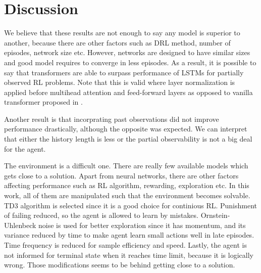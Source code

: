 \section{Discussion}
We believe that these results are not enough to say any model is superior to another, because there are other factors such as DRL method, number of episodes, network size etc. 
However, networks are designed to have similar sizes and good model requires to converge in less episodes. 
As a result, it is possible to say that transformers are able to surpass performance of LSTMs for partially observed RL problems. 
Note that this is valid where layer normalization is applied before multihead attention and feed-forward layers \cite{xiong_layer_2020} as opposed to vanilla transformer proposed in \cite{vaswani_attention_2017}. 

Another result is that incorprating past observations did not improve performance drastically, although the opposite was expected. 
We can interpret that either the history length is less or the partial observability is not a big deal for the agent. 

The environment is a difficult one. 
There are really few available models which gets close to a solution. 
Apart from neural networks, there are other factors affecting performance such as RL algorithm, rewarding, exploration etc. 
In this work, all of them are manipulated such that the environment becomes solvable. 
TD3 algorithm is selected since it is a good choice for continious RL. 
Punishment of failing reduced, so the agent is allowed to learn by mistakes. 
Ornstein-Uhlenbeck noise is used for better exploration since it has momentum, and its variance reduced by time to make agent learn small actions well in late episodes. 
Time frequency is reduced for sample efficiency and speed. 
Lastly, the agent is not informed for terminal state when it reaches time limit, because it is logically wrong. Those modifications seems to be behind getting close to a solution. 
